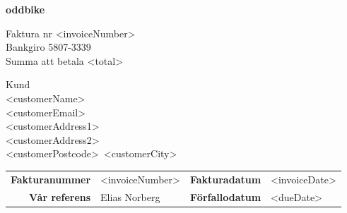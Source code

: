 \documentclass[a4paper,11pt]{extarticle}
\begin{document}
\pagestyle{fancy}
\fancyhf{} %
\renewcommand{\headrulewidth}{0pt}
\renewcommand{\footrulewidth}{0pt}

\setlength{\fboxsep}{1.5em}
\setlength{\parindent}{0pt}

{\color{OliveGreen}
\fontsize{48}{0}\selectfont
\hspace{-0.6em}
\textbf{
oddbike}}

\vspace{2em}
\begin{minipage}[t]{0.45\textwidth}
{\huge
    Faktura nr <invoiceNumber>}\\
{\large
    Bankgiro 5807-3339 \\
    Summa att betala <total>\\
}
    \vspace{2em}
\end{minipage}
\begin{minipage}[t]{0.3\textwidth}
{\huge Kund}\\
<customerName>\\
<customerEmail>\\
<customerAddress1>\\
<customerAddress2>\\
<customerPostcode>~<customerCity>\\
\end{minipage}

\renewcommand\arraystretch{1.5}
\begin{tabular*}{\linewidth}{rlrl}
\hline
    \textbf{Fakturanummer} & <invoiceNumber> & \textbf{Fakturadatum} & <invoiceDate> \\
    \textbf{Vår referens} & Elias Norberg & \textbf{Förfallodatum} & <dueDate> \\
\hline
\end{tabular*}
\end{document}
